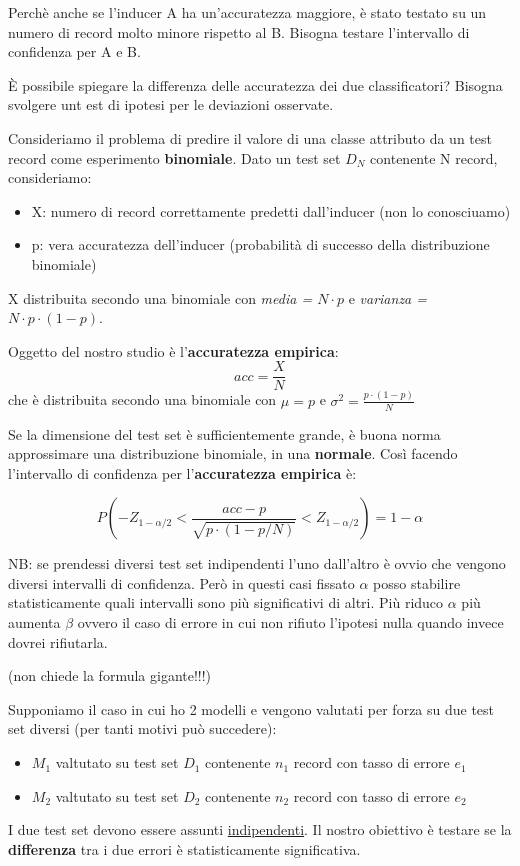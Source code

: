 Perch\`e anche se l'inducer A ha un'accuratezza maggiore, \`e stato testato su un numero di record molto minore rispetto al B. Bisogna testare l'intervallo di confidenza per A e B.

\`E possibile spiegare la differenza delle accuratezza dei due classificatori? Bisogna svolgere unt est di ipotesi per le deviazioni osservate.

Consideriamo il problema di predire il valore di una classe attributo da un test record come esperimento \textbf{binomiale}. Dato un test set $D_N$ contenente N record, consideriamo:

\begin{itemize}
	\item X: numero di record correttamente predetti dall'inducer (non lo conosciuamo)
	\item p: vera accuratezza dell'inducer (probabilit\`a di successo della distribuzione binomiale)
\end{itemize}

X distribuita secondo una binomiale con \textit{media = $N \cdot p$} e \textit{varianza = $N \cdot p \cdot (1-p)$}. 

Oggetto del nostro studio \`e l'\textbf{accuratezza empirica}: \[acc = \frac{X}{N} \] che \`e distribuita secondo una binomiale con $\mu = p$ e $\sigma^2 = \frac{p \cdot (1-p)}{N}$

Se la dimensione del test set \`e sufficientemente grande, \`e buona norma approssimare una distribuzione binomiale, in una \textbf{normale}. Cos\`i facendo l'intervallo di confidenza per l'\textbf{accuratezza empirica} \`e:

\[ P(-Z_{1-\alpha/2} < \frac{acc - p}{\sqrt{p \cdot (1-p / N)}} < Z_{1 - \alpha/2}) = 1 - \alpha \]

NB: se prendessi diversi test set indipendenti l'uno dall'altro \`e ovvio che vengono diversi intervalli di confidenza. Per\`o in questi casi fissato $\alpha$ posso stabilire statisticamente quali intervalli sono pi\`u significativi di altri. Pi\`u riduco $\alpha$ pi\`u aumenta $\beta$ ovvero il caso di errore in cui non rifiuto l'ipotesi nulla quando invece dovrei rifiutarla.

(non chiede la formula gigante!!!)

Supponiamo il caso in cui ho 2 modelli e vengono valutati per forza su due test set diversi (per tanti motivi pu\`o succedere):
\begin{itemize}
	\item $M_1$ valtutato su test set $D_1$ contenente $n_1$ record con tasso di errore $e_1$
	\item $M_2$ valtutato su test set $D_2$ contenente $n_2$ record con tasso di errore $e_2$
\end{itemize}
I due test set devono essere assunti \underline{indipendenti}. Il nostro obiettivo \`e testare se la \textbf{differenza} tra i due errori \`e statisticamente significativa.

